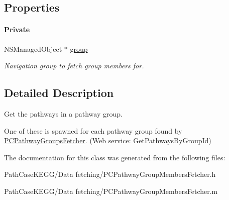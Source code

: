 \subsection*{Properties}
\begin{Indent}\paragraph*{Private}
\begin{DoxyCompactItemize}
\item 
\hypertarget{interface_p_c_pathway_group_members_fetcher_a1f5d9472c1fe83374f0f6b2ba30ee233}{
NSManagedObject $\ast$ \hyperlink{interface_p_c_pathway_group_members_fetcher_a1f5d9472c1fe83374f0f6b2ba30ee233}{group}}
\label{interface_p_c_pathway_group_members_fetcher_a1f5d9472c1fe83374f0f6b2ba30ee233}

\begin{DoxyCompactList}\small\item\em Navigation group to fetch group members for. \end{DoxyCompactList}\end{DoxyCompactItemize}
\end{Indent}


\subsection{Detailed Description}
Get the pathways in a pathway group. 

One of these is spawned for each pathway group found by \hyperlink{interface_p_c_pathway_groups_fetcher}{PCPathwayGroupsFetcher}. (Web service: {\ttfamily GetPathwaysByGroupId}) 

The documentation for this class was generated from the following files:\begin{DoxyCompactItemize}
\item 
PathCaseKEGG/Data fetching/PCPathwayGroupMembersFetcher.h\item 
PathCaseKEGG/Data fetching/PCPathwayGroupMembersFetcher.m\end{DoxyCompactItemize}
